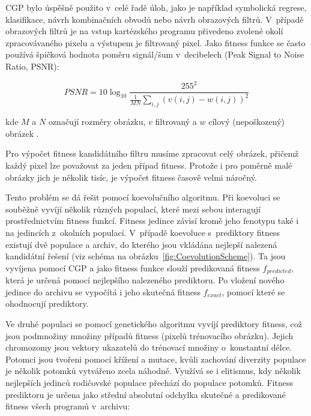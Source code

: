 \documentclass[czech]{ExcelAtFIT} %
\begin{document}
CGP bylo úspěšně použito v~celé řadě úloh, jako je například symbolická regrese, klasifikace, návrh kombinačních obvodů nebo návrh obrazových filtrů. V~případě obrazových filtrů je na vstup kartézského programu přivedeno zvolené okolí zpracovávaného pixelu a výstupem je filtro\-va\-ný pixel. Jako fitness funkce se často používá špičková hodnota poměru signál/šum v~decibelech (Peak Signal to Noise Ratio, PSNR):

\begin{equation}
    \label{eq:PSNR}
    \mathit{PSNR} = 10 \log_{10} \frac{255^2}{\frac{1}{MN} \sum\limits_{i,j} \left( v\left( i, j \right) - w\left( i, j \right)  \right)^2 }
\end{equation}

\noindent{}kde $M$ a $N$ označují rozměry obrázku, $v$ filtrovaný a $w$ cílový (nepoškozený) obrázek \cite{ZelenaIF}.

Pro výpočet fitness kandidátního filtru musíme zpracovat celý obrázek, přičemž každý pixel lze považovat za jeden případ fitness. Protože i pro po\-měrně malé obrázky jich je několik tisíc, je výpočet fitness časově velmi náročný.

Tento problém se dá řešit pomocí koevolučního algoritmu. Při koevoluci se souběžně vyvíjí několik různých populací, které mezi sebou interagují prostřednictvím fitness funkcí. Fitness jedince závisí kromě jeho fenotypu také i na jedincích z~okolních populací. V~případě koevoluce s~prediktory fitness existují dvě populace a archiv, do kterého jsou vkládána nej\-lep\-ší nalezená kandidátní řešení (viz schéma na obrázku~\ref{fig:CoevolutionScheme}). Ta jsou vyvíjena pomocí CGP a jako fitness funkce slouží predikovaná fitness $f_{\mathit{predicted}}$, která je určená pomocí nej\-lep\-šího nalezeného prediktoru. Po vložení nového jedince do archivu se vypočítá i jeho skutečná fitness $f_{\mathit{exact}}$, pomocí které se ohodnocují prediktory.

Ve druhé populaci se pomocí genetického algoritmu vyvíjí prediktory fitness, což jsou pod\-mno\-žiny mno\-žiny případů fitness (pixelů trénovacího obrázku). Jejich chromozomy jsou vek\-tory ukazatelů do trénovací množiny o~konstantní délce. Potomci jsou tvořeni pomocí křížení a mutace, kvůli zachování diverzity populace je ně\-ko\-lik potomků vytvářeno zcela náhodně. Využívá se i eli\-tis\-mus, kdy několik nejlepších jedinců rodičovské populace přechází do populace potomků. Fitness prediktoru je určena jako střední absolutní odchylka skutečné a predikované fitness všech programů v~archivu:
\end{document}
